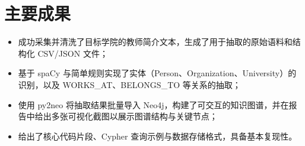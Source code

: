\section{主要成果}
\begin{itemize}
    \item 成功采集并清洗了目标学院的教师简介文本，生成了用于抽取的原始语料和结构化 CSV/JSON 文件；
    \item 基于 spaCy 与简单规则实现了实体（Person、Organization、University）的识别，以及 WORKS\_AT、BELONGS\_TO 等关系的抽取；
    \item 使用 py2neo 将抽取结果批量导入 Neo4j，构建了可交互的知识图谱，并在报告中给出多张可视化截图以展示图谱结构与关键节点；
    \item 给出了核心代码片段、Cypher 查询示例与数据存储格式，具备基本复现性。
\end{itemize}
